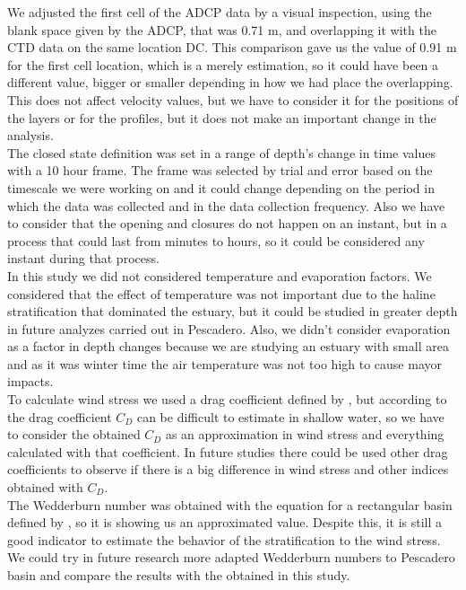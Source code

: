 \documentclass[tesis.tex]{subfiles}
\begin{document}
We adjusted the first cell of the ADCP data by a visual inspection, using the blank space given by the ADCP, that was 0.71 m, and overlapping it with the CTD data on the same location DC. This comparison gave us the value of 0.91 m for the first cell location, which is a merely estimation, so it could have been a different value, bigger or smaller depending in how we had place the overlapping. This does not affect velocity values, but we have to consider it for the positions of the layers or for the profiles, but it does not make an important change in the analysis.\\

The closed state definition was set in a range of depth's change in time values with a 10 hour frame. The frame was selected by trial and error based on the timescale we were working on and it could change depending on the period in which the data was collected and in the data collection frequency. Also we have to consider that the opening and closures do not happen on an instant, but in a process that could last from minutes to hours, so it could be considered any instant during that process.\\ 

In this study we did not considered temperature and evaporation factors. We considered that the effect of temperature was not important due to the haline stratification that dominated the estuary, but it could be studied in greater depth in future analyzes carried out in Pescadero. Also, we didn't consider evaporation as a factor in depth changes because we are studying an estuary with small area and as it was winter time the air temperature was not too high to cause mayor impacts.\\

To calculate wind stress we used a drag coefficient defined by \cite{large1981open}, but according to \cite{paugam2021wind} the drag coefficient $C_D$ can be difficult to estimate in shallow water, so we have to consider the obtained $C_D$ as an approximation in wind stress and everything calculated with that coefficient. In future studies there could be used other drag coefficients to observe if there is a big difference in wind stress and other indices obtained with $C_D$.\\

The Wedderburn number was obtained with the equation for a rectangular basin defined by \cite{Monismith1985}, so it is showing us an approximated value. Despite this, it is still a good indicator to estimate the behavior of the stratification to the wind stress. We could try in future research more adapted Wedderburn numbers to Pescadero basin and compare the results with the obtained in this study.\\
\end{document}
